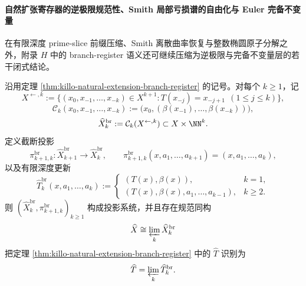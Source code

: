 \paragraph{自然扩张寄存器的逆极限规范性、Smith 局部亏损谱的自由化与 Euler 完备不变量}
在有限深度 prime-slice 前缀压缩、Smith 离散曲率恢复与整数椭圆原子分解之外，附录 \(H\) 中的 branch-register 语义还可继续压缩为逆极限与完备不变量层的若干闭式结论。

\begin{theorem}[自然扩张分支寄存器系统是有限深度截断的严格逆极限]\label{thm:xi-branch-register-strict-inverse-limit}
沿用定理 \ref{thm:killo-natural-extension-branch-register} 的记号。对每个 \(k\ge 1\)，记
\[
X^{\leftarrow,k}
:=
\{(x_0,x_{-1},\dots,x_{-k})\in X^{k+1}:T(x_{-j})=x_{-j+1}\ \ (1\le j\le k)\},
\]
\[
\mathcal C_k(x_0,x_{-1},\dots,x_{-k})
:=
\bigl(x_0,(\beta(x_{-1}),\dots,\beta(x_{-k}))\bigr),
\]
\[
\widehat X_k^{\mathrm{br}}
:=
\mathcal C_k(X^{\leftarrow,k})
\subset X\times \NN^k.
\]
定义截断投影
\[
\pi_{k+1,k}^{\mathrm{br}}:\widehat X_{k+1}^{\mathrm{br}}\to \widehat X_k^{\mathrm{br}},
\qquad
\pi_{k+1,k}^{\mathrm{br}}(x,a_1,\dots,a_{k+1})=(x,a_1,\dots,a_k),
\]
以及有限深度更新
\[
\widehat T_k^{\mathrm{br}}(x,a_1,\dots,a_k)
:=
\begin{cases}
(T(x),\beta(x)),& k=1,\\
(T(x),\beta(x),a_1,\dots,a_{k-1}),& k\ge 2.
\end{cases}
\]
则 \((\widehat X_k^{\mathrm{br}},\pi_{k+1,k}^{\mathrm{br}})_{k\ge 1}\) 构成投影系统，并且存在规范同构
\[
\widehat X
\cong
\varprojlim_{k}\widehat X_k^{\mathrm{br}}
\]
把定理 \ref{thm:killo-natural-extension-branch-register} 中的 \(\widehat T\) 识别为
\[
\widehat T
=
\varprojlim_{k}\widehat T_k^{\mathrm{br}}.
\]
\end{theorem}
